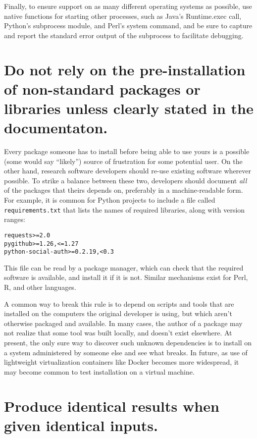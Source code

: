 \documentclass[10pt]{article}
\begin{document}
Finally, to ensure support on as many different operating systems as
possible, use native functions for starting other processes, such as
Java's Runtime.exec call, Python's subprocess module, and Perl's system
command, and be sure to capture and report the standard error output of
the subprocess to facilitate debugging.

\section{Do not rely on the pre-installation of non-standard packages or libraries unless clearly stated in the documentaton.}

Every package someone has to install before being able to use yours is a
possible (some would say ``likely'') source of frustration for some
potential user. On the other hand, research software developers should
re-use existing software wherever possible. To strike a balance between
these two, developers should document \emph{all} of the packages that
theirs depends on, preferably in a machine-readable form. For example,
it is common for Python projects to include a file called
\texttt{requirements.txt} that lists the names of required libraries,
along with version ranges:

\begin{verbatim}
requests>=2.0
pygithub>=1.26,<=1.27
python-social-auth>=0.2.19,<0.3
\end{verbatim}

This file can be read by a package manager, which can check that the
required software is available, and install it if it is not. Similar
mechanisms exist for Perl, R, and other languages.

A common way to break this rule is to depend on scripts and tools that
are installed on the computers the original developer is using, but
which aren't otherwise packaged and available. In many cases, the author
of a package may not realize that some tool was built locally, and
doesn't exist elsewhere. At present, the only sure way to discover such
unknown dependencies is to install on a system administered by someone
else and see what breaks. In future, as use of lightweight
virtualization containers like Docker becomes more widespread, it may
become common to test installation on a virtual machine.

\section{Produce identical results when given identical inputs.}
\end{document}
